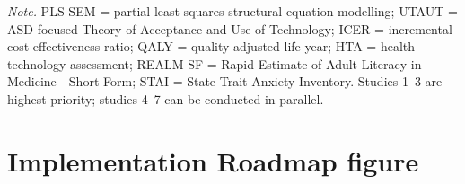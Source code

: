 \vspace{0.5em}\noindent\textit{Note.} PLS-SEM = partial least squares structural equation modelling; UTAUT = ASD-focused Theory of Acceptance and Use of Technology; ICER = incremental cost-effectiveness ratio; QALY = quality-adjusted life year; HTA = health technology assessment; REALM-SF = Rapid Estimate of Adult Literacy in Medicine---Short Form; STAI = State-Trait Anxiety Inventory. Studies 1--3 are highest priority; studies 4--7 can be conducted in parallel.
\fi %

\section{Implementation Roadmap figure}
\label{sec:appendix_ch5_s9}

